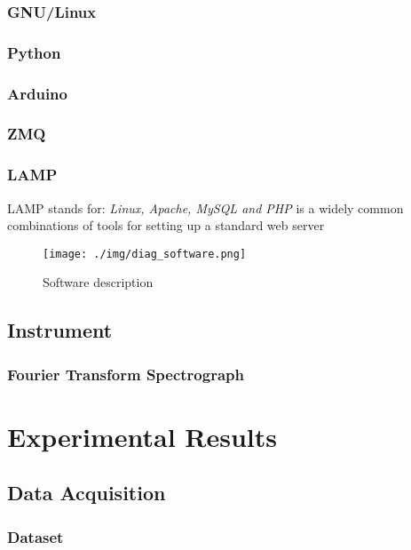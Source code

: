 \documentclass[master,       %
               twoside,        %
               BCOR10mm,       %
               ngerman,english  %
               ]{GAUBM_astro}
\begin{document}
\subsection{GNU/Linux}
\subsection{Python}
\subsection{Arduino}
\subsection{ZMQ}
\subsection{LAMP}
LAMP stands for: \emph{Linux, Apache, MySQL and PHP} is a widely common combinations of tools for setting up a standard 
web server
\begin{center}
 \begin{figure}[h!]
 \centering
 \texttt{[image: ./img/diag\_software.png]}
 \caption{Software description}
 \label{fig:diag_software}
\end{figure}
\end{center}
\section{Instrument}
\subsection{Fourier Transform Spectrograph}


\chapter{Experimental Results}
\section{Data Acquisition}
\subsection{Dataset}
\end{document}
